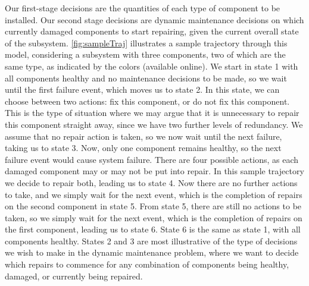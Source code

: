 \documentclass[11pt,authoryear,a4paper]{article}
\theoremstyle{definition}
\begin{document}
Our first-stage decisions are the quantities of each type of component to be installed. Our second stage decisions are dynamic maintenance decisions on which currently damaged components to start repairing, given the current overall state of the subsystem. \autoref{fig:sampleTraj} illustrates a sample trajectory through this model, considering a subsystem with three components, two of which are the same type, as indicated by the colors (available online). We start in state 1 with all components healthy and no maintenance decisions to be made, so we wait until the first failure event, which moves us to state 2. In this state, we can choose between two actions: fix this component, or do not fix this component. This is the type of situation where we may argue that it is unnecessary to repair this component straight away, since we have two further levels of redundancy. We assume that no repair action is taken, so we now wait until the next failure, taking us to state 3. Now, only one component remains healthy, so the next failure event would cause system failure. There are four possible actions, as each damaged component may or may not be put into repair. In this sample trajectory we decide to repair both, leading us to state 4. Now there are no further actions to take, and we simply wait for the next event, which is the completion of repairs on the second component in state 5. From state 5, there are still no actions to be taken, so we simply wait for the next event, which is the completion of repairs on the first component, leading us to state 6. State 6 is the same as state 1, with all components healthy. States 2 and 3 are most illustrative of the type of decisions we wish to make in the dynamic maintenance problem, where we want to decide which repairs to commence for any combination of components being healthy, damaged, or currently being repaired.
\end{document}
